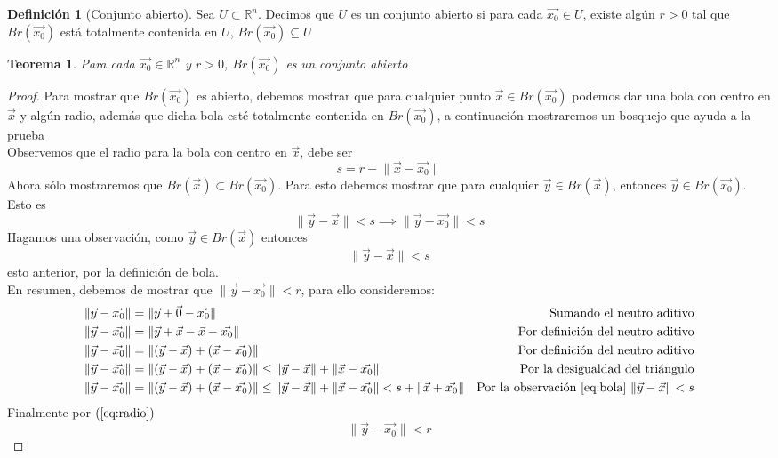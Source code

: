 \documentclass[letterpaper]{article}
\providecommand{\norm}[1]{\lVert#1\rVert}
\newcommand{\R}{\mathds{R}}
\renewcommand{\*}{\cdot}
\newtheorem{theorem}{Teorema}[section]
\theoremstyle{definition}
\newtheorem{definition}{Definición}
\begin{document}
%
%
\begin{definition}[Conjunto abierto]
	Sea $ U \subset \R^n $. Decimos que $ U $ es un conjunto abierto si para cada $ \vec{x_0} \in U $, existe algún $ r > 0 $ tal que $ Br(\vec{x_0}) $ está totalmente contenida en $ U $, $ Br(\vec{x_0}) \subseteq U $
\end{definition}
%
%
\begin{theorem}
	Para cada $ \vec{x_0} \in \R^n $ y $ r >0 $, $ Br(\vec{x_0})  $ es un conjunto abierto
\end{theorem}
\begin{proof}
	Para mostrar que $ Br(\vec{x_0}) $ es abierto, debemos mostrar que para cualquier punto $ \vec{x} \in Br(\vec{x_0})  $ podemos dar una bola con centro en $ \vec{x} $ y algún radio, además que dicha bola esté totalmente contenida en $ Br(\vec{x_0}) $, a continuación mostraremos un bosquejo que ayuda a la prueba\\

Observemos que el radio para la bola con centro en $ \vec{x} $, debe ser \[ s = r - \norm{\vec{x} - \vec{x_0}} \label{eq:radio} \tag{1} \]
Ahora sólo mostraremos que $ Br(\vec{x}) \subset Br(\vec{x_0}) $. Para esto debemos mostrar que para cualquier $ \vec{y} \in Br(\vec{x}) $, entonces $ \vec{y} \in Br(\vec{x_0}) $. Esto es \[ \norm{ \vec{y} - \vec{x} } < s \implies \norm{\vec{y} - \vec{x_0}} < s \] Hagamos una observación, como $ \vec{y} \in Br(\vec{x}) $ entonces \[ \norm{ \vec{y} - \vec{x} } < s \label{eq:bola} \tag{2} \] esto anterior, por la definición de bola.\\
	
	En resumen, debemos de mostrar que $ \norm{\vec{y} - \vec{x_0} } < r $, para ello consideremos:
	\begin{align*}
	\norm{\vec{y} - \vec{x_0}} &= \norm{\vec{y} + \vec{0} - \vec{x_0}} & \text{Sumando el neutro aditivo}\\
	\norm{\vec{y} - \vec{x_0}} &= \norm{\vec{y} + \vec{x} - \vec{x} - \vec{x_0}} & \text{Por definición del neutro aditivo}\\
	\norm{\vec{y} - \vec{x_0}} &= \norm{(\vec{y} - \vec{x}) + (\vec{x} - \vec{x_0})} & \text{Por definición del neutro aditivo}\\
	\norm{\vec{y} - \vec{x_0}} &= \norm{(\vec{y} - \vec{x}) + (\vec{x} - \vec{x_0})} \leq \norm{\vec{y} - \vec{x}} + \norm{ \vec{x} - \vec{x_0} } & \text{Por la desigualdad del triángulo}\\
	\norm{\vec{y} - \vec{x_0}} &= \norm{(\vec{y} - \vec{x}) + (\vec{x} - \vec{x_0})} \leq \norm{\vec{y} - \vec{x}} + \norm{ \vec{x} - \vec{x_0} } < s + \norm{\vec{x} + \vec{x_0}} & \text{Por la observación \ref{eq:bola} } \norm{ \vec{y} - \vec{x} } < s 
	\end{align*}
	Finalmente por $ (\ref{eq:radio}) $ \[ \norm{\vec{y} - \vec{x_0}}< r \]
\end{proof}
\end{document}
